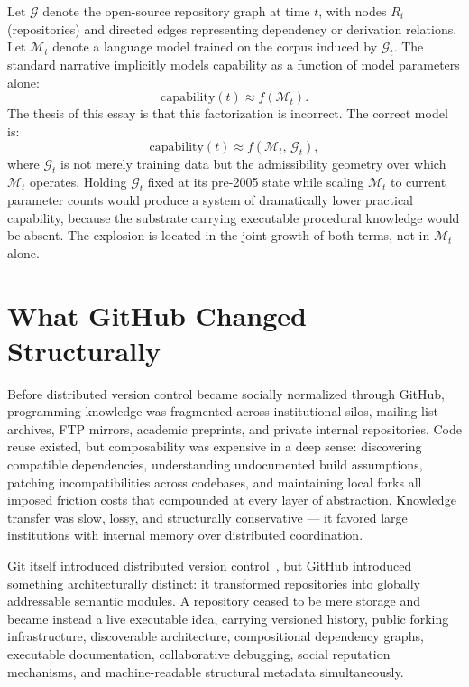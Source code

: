 \documentclass[11pt]{article}
\begin{document}
Let $\mathcal{G}$ denote the open-source repository graph at time $t$, with
nodes $R_i$ (repositories) and directed edges representing dependency or
derivation relations. Let $\mathcal{M}_t$ denote a language model trained on
the corpus induced by $\mathcal{G}_t$. The standard narrative implicitly models
capability as a function of model parameters alone:
\[
\mathrm{capability}(t) \approx f(\mathcal{M}_t).
\]
The thesis of this essay is that this factorization is incorrect. The correct
model is:
\[
\mathrm{capability}(t) \approx f(\mathcal{M}_t,\, \mathcal{G}_t),
\]
where $\mathcal{G}_t$ is not merely training data but the admissibility geometry
over which $\mathcal{M}_t$ operates. Holding $\mathcal{G}_t$ fixed at its
pre-2005 state while scaling $\mathcal{M}_t$ to current parameter counts would
produce a system of dramatically lower practical capability, because the
substrate carrying executable procedural knowledge would be absent. The
explosion is located in the joint growth of both terms, not in $\mathcal{M}_t$
alone.

\section{What GitHub Changed Structurally}

Before distributed version control became socially normalized through GitHub,
programming knowledge was fragmented across institutional silos, mailing list
archives, FTP mirrors, academic preprints, and private internal repositories.
Code reuse existed, but composability was expensive in a deep sense: discovering
compatible dependencies, understanding undocumented build assumptions, patching
incompatibilities across codebases, and maintaining local forks all imposed
friction costs that compounded at every layer of abstraction. Knowledge transfer
was slow, lossy, and structurally conservative --- it favored large institutions
with internal memory over distributed coordination.

Git itself introduced distributed version control~\cite{git2005,torvalds2001},
but GitHub introduced something architecturally distinct: it transformed
repositories into globally addressable semantic modules. A repository ceased to
be mere storage and became instead a live executable idea, carrying versioned
history, public forking infrastructure, discoverable architecture, compositional
dependency graphs, executable documentation, collaborative debugging, social
reputation mechanisms, and machine-readable structural metadata simultaneously.
\end{document}
